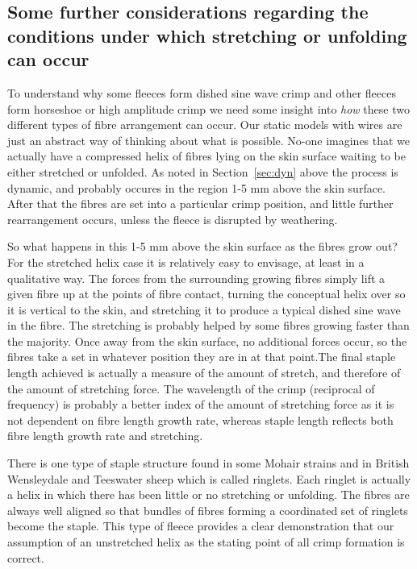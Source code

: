 \documentclass[titlepage,10pt]{article}  %
\begin{document}
\subsection{Some further considerations regarding the conditions under which stretching or unfolding can occur}
\label{sec:further}
To understand why some fleeces form dished sine wave crimp and other fleeces form horseshoe or high amplitude crimp we need some insight into {\em how} these two different types of fibre arrangement can occur. Our static models with wires are just an abstract way of thinking about what is possible. No-one imagines that we actually have a compressed helix of fibres lying on the skin surface waiting to be either stretched or unfolded.  As noted in Section~\ref{sec:dyn} above the process is dynamic, and probably occures in the region 1-5 mm above the skin surface. After that the fibres are set into a particular crimp position, and little further rearrangement occurs, unless the fleece is disrupted by weathering.

So what happens in this 1-5 mm above the skin surface as the fibres grow out? For the stretched helix case it is relatively easy to envisage, at least in a qualitative way. The forces from the surrounding growing fibres simply lift a given fibre up at the points of fibre contact, turning the conceptual helix over so it is vertical to the skin,  and stretching it to produce a typical dished sine wave in the fibre. The stretching is probably helped by some fibres growing faster than the majority.  Once away from the skin surface, no additional forces occur, so the fibres take a set in whatever position they are in at that point.The final staple length achieved is actually a measure of the amount of stretch, and therefore of the amount of stretching force. The wavelength of the crimp (reciprocal of frequency) is probably a better index of the amount of stretching force as it is not dependent on fibre length growth rate, whereas staple length reflects both fibre length growth rate and stretching. 

There is one type of staple structure found in some Mohair strains and in British Wensleydale and Teeswater sheep which is called ringlets. Each ringlet is actually a helix in which there has been little or no stretching or unfolding. The fibres are always well aligned so that bundles of fibres forming a coordinated set of ringlets become the staple. This type of fleece provides a clear demonstration that our assumption of an unstretched helix as the stating point of all crimp formation is correct.  
\end{document}
